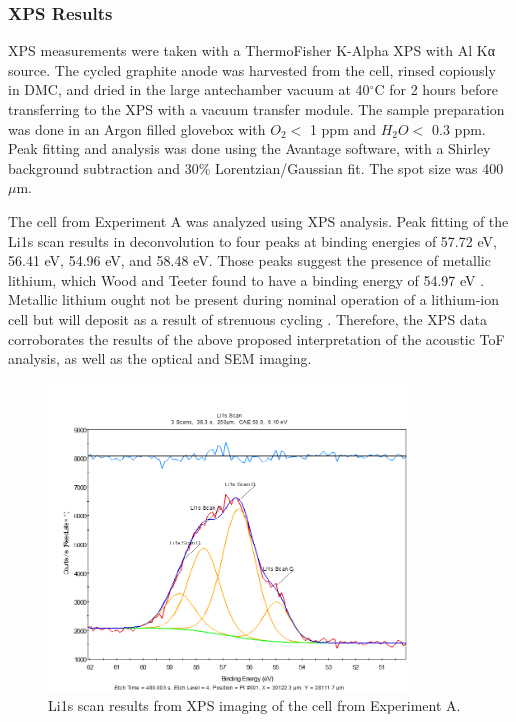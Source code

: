 \subsubsection{XPS Results}
XPS measurements were taken with a ThermoFisher K-Alpha XPS with Al Kα source. The cycled graphite anode was harvested from the cell, rinsed copiously in DMC, and dried in the large antechamber vacuum at 40$^{\circ}$C for 2 hours before transferring to the XPS with a vacuum transfer module. The sample preparation was done in an Argon filled glovebox with $O_2 <$ 1 ppm and $H_2O <$ 0.3 ppm. Peak fitting and analysis was done using the Avantage software, with a Shirley background subtraction and 30\% Lorentzian/Gaussian fit. The spot size was 400 $\mu$m.

The cell from Experiment A was analyzed using XPS analysis. Peak fitting of the Li1s scan results in deconvolution to four peaks at binding energies of 57.72 eV, 56.41 eV, 54.96 eV, and 58.48 eV. Those peaks suggest the presence of metallic lithium, which Wood and Teeter found to have a binding energy of 54.97 eV \cite{BE}. Metallic lithium ought not be present during nominal operation of a lithium-ion cell but will deposit as a result of strenuous cycling \cite{lithium}. Therefore, the XPS data corroborates the results of the above proposed interpretation of the acoustic ToF analysis, as well as the optical and SEM imaging.

\begin{figure}[h!]\label{fig:xps}
    \includegraphics[width=0.85\textwidth]{Thesis/xps.png}
    \centering
    \caption{Li1s scan results from XPS imaging of the cell from Experiment A.}
\end{figure}

